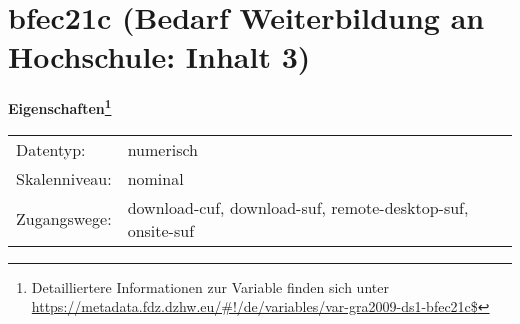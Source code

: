 
    \setcounter{footnote}{0}

    \vspace*{-1.8cm}
	\section{bfec21c (Bedarf Weiterbildung an Hochschule: Inhalt 3)}
	\label{section:bfec21c}



    \vspace*{0.5cm}
    \noindent\textbf{Eigenschaften\footnote{Detailliertere Informationen zur Variable finden sich unter
		\url{https://metadata.fdz.dzhw.eu/\#!/de/variables/var-gra2009-ds1-bfec21c$}}}\\
	\begin{tabularx}{\hsize}{@{}lX}
	Datentyp: & numerisch \\
	Skalenniveau: & nominal \\
	Zugangswege: &
	  download-cuf, 
	  download-suf, 
	  remote-desktop-suf, 
	  onsite-suf
 \\
    \end{tabularx}



